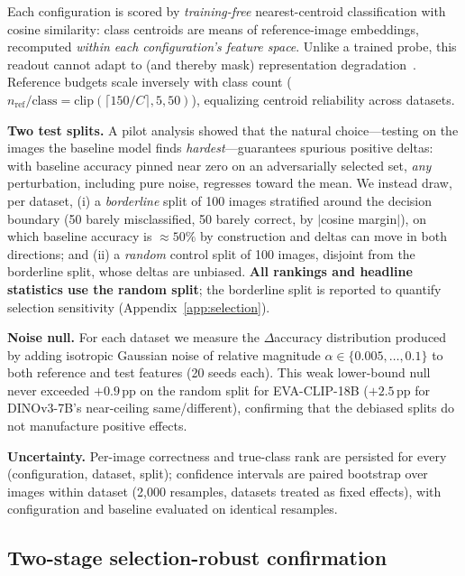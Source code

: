 \documentclass{article}
\newcommand{\eva}{EVA-CLIP-18B}
\newcommand{\dino}{DINOv3-7B}
\newcommand{\pp}{\,\mathrm{pp}}
\begin{document}
Each configuration is scored by \emph{training-free} nearest-centroid
classification with cosine similarity: class centroids are means of
reference-image embeddings, recomputed \emph{within each configuration's
feature space}. Unlike a trained probe, this readout cannot adapt to (and
thereby mask) representation degradation~\citep{alain2017understanding}.
Reference budgets scale inversely with class count
($n_{\mathrm{ref}}/\mathrm{class} = \mathrm{clip}(\lceil 150/C \rceil, 5, 50)$),
equalizing centroid reliability across datasets.

\textbf{Two test splits.} A pilot analysis showed that the natural
choice---testing on the images the baseline model finds
\emph{hardest}---guarantees spurious positive deltas: with baseline
accuracy pinned near zero on an adversarially selected set, \emph{any}
perturbation, including pure noise, regresses toward the mean. We instead
draw, per dataset, (i) a \emph{borderline} split of 100 images stratified
around the decision boundary (50 barely misclassified, 50 barely correct,
by $|$cosine margin$|$), on which baseline accuracy is $\approx 50\%$ by
construction and deltas can move in both directions; and (ii) a
\emph{random} control split of 100 images, disjoint from the borderline
split, whose deltas are unbiased. \textbf{All rankings and headline
statistics use the random split}; the borderline split is reported to
quantify selection sensitivity (Appendix~\ref{app:selection}).

\textbf{Noise null.} For each dataset we measure the $\Delta$accuracy
distribution produced by adding isotropic Gaussian noise of relative
magnitude $\alpha \in \{0.005,\dots,0.1\}$ to both reference and test
features (20 seeds each). This weak lower-bound null never exceeded
$+0.9\pp$ on the random split for \eva{} ($+2.5\pp$ for \dino{}'s
near-ceiling same/different), confirming that the debiased splits do not
manufacture positive effects.

\textbf{Uncertainty.} Per-image correctness and true-class rank are
persisted for every (configuration, dataset, split); confidence intervals
are paired bootstrap over images within dataset (2{,}000 resamples,
datasets treated as fixed effects), with configuration and baseline
evaluated on identical resamples.

\subsection{Two-stage selection-robust confirmation}
\label{sec:confirm}
\end{document}
